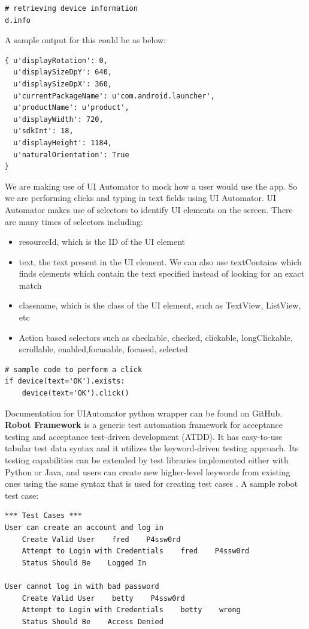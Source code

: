 \documentclass[a4paper,12pt]{article}
\begin{document}
\begin{lstlisting}[style=PyStyle]
# retrieving device information
d.info 
\end{lstlisting}

A sample output for this could be as below:
\begin{lstlisting}[style=PyStyle]
{ u'displayRotation': 0,
  u'displaySizeDpY': 640,
  u'displaySizeDpX': 360,
  u'currentPackageName': u'com.android.launcher',
  u'productName': u'product',
  u'displayWidth': 720,
  u'sdkInt': 18,
  u'displayHeight': 1184,
  u'naturalOrientation': True
}
\end{lstlisting}

We are making use of UI Automator to mock how a user would use the app. So we are performing clicks and typing in text fields using UI Automator. UI Automator makes use of selectors to identify UI elements on the screen. There are many times of selectors including:
\begin{itemize}
	\item resourceId, which is the ID of the UI element
	\item text, the text present in the UI element. We can also use textContains which finds elements which contain the text specified instead of looking for an exact match
	\item classname, which is the class of the UI element, such as TextView, ListView, etc
	\item Action based selectors such as checkable, checked, clickable, longClickable, scrollable, enabled,focusable, focused, selected
\end{itemize}
\begin{lstlisting}[style=PyStyle]
# sample code to perform a click
if device(text='OK').exists:
    device(text='OK').click()
\end{lstlisting}
Documentation for UIAutomator python wrapper can be found on GitHub. \cite{uiautomatordoc}\\

\textbf{Robot Framework} is a generic test automation framework for acceptance testing and acceptance test-driven development (ATDD). It has easy-to-use tabular test data syntax and it utilizes the keyword-driven testing approach. Its testing capabilities can be extended by test libraries implemented either with Python or Java, and users can create new higher-level keywords from existing ones using the same syntax that is used for creating test cases \cite{robot}.
A sample robot test case:
\begin{lstlisting}[style=PyStyle]
*** Test Cases ***
User can create an account and log in
    Create Valid User    fred    P4ssw0rd
    Attempt to Login with Credentials    fred    P4ssw0rd
    Status Should Be    Logged In

User cannot log in with bad password
    Create Valid User    betty    P4ssw0rd
    Attempt to Login with Credentials    betty    wrong
    Status Should Be    Access Denied
\end{lstlisting}
\end{document}
